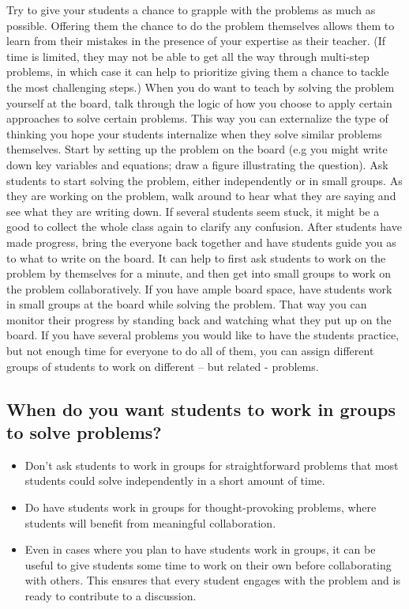 Try to give your students a chance to grapple with the problems as much as possible.  Offering them the chance to do the problem themselves allows them to learn from their mistakes in the presence of your expertise as their teacher. (If time is limited, they may not be able to get all the way through multi-step problems, in which case it can help to prioritize giving them a chance to tackle the most challenging steps.)
When you do want to teach by solving the problem yourself at the board, talk through the logic of how you choose to apply certain approaches to solve certain problems.  This way you can externalize the type of thinking you hope your students internalize when they solve similar problems themselves.
Start by setting up the problem on the board (e.g you might write down key variables and equations; draw a figure illustrating the question).  Ask students to start solving the problem, either independently or in small groups.  As they are working on the problem, walk around to hear what they are saying and see what they are writing down. If several students seem stuck, it might be a good to collect the whole class again to clarify any confusion.  After students have made progress, bring the everyone back together and have students guide you as to what to write on the board.
It can help to first ask students to work on the problem by themselves for a minute, and then get into small groups to work on the problem collaboratively.
If you have ample board space, have students work in small groups at the board while solving the problem.  That way you can monitor their progress by standing back and watching what they put up on the board.
If you have several problems you would like to have the students practice, but not enough time for everyone to do all of them, you can assign different groups of students to work on different – but related - problems.


\subsection{When do you want students to work in groups to solve problems?}
\label{sec:when-do-you}

\begin{itemize}
\item Don’t ask students to work in groups for straightforward problems that most students could solve independently in a short amount of time.
  
\item Do have students work in groups for thought-provoking problems, where students will benefit from meaningful collaboration.
  
\item Even in cases where you plan to have students work in groups, it can be useful to give students some time to work on their own before collaborating with others.  This ensures that every student engages with the problem and is ready to contribute to a discussion.
\end{itemize}

